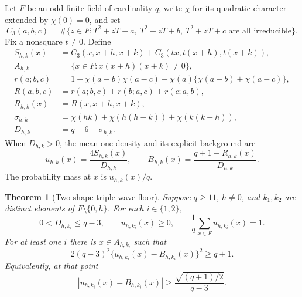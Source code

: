 \documentclass[11pt]{article}
\newtheorem{theorem}{Theorem}[section]
\begin{document}
Let \(F\) be an odd finite field of cardinality \(q\), write
\(\chi\) for its quadratic character extended by \(\chi(0)=0\), and set
\[
 C_3(a,b,c)=\#\{z\in F:T^2+zT+a,\ T^2+zT+b,\ T^2+zT+c
                       \text{ are all irreducible}\}.
\]
Fix a nonsquare \(t\ne0\). Define
\[
 \begin{split}
 S_{h,k}(x)&=C_3(x,x+h,x+k)
       +C_3(tx,t(x+h),t(x+k)),\\
 A_{h,k}&=\{x\in F:x(x+h)(x+k)\ne0\},\\
 r(a;b,c)&=1+\chi(a-b)\chi(a-c)
                    -\chi(a)\{\chi(a-b)+\chi(a-c)\},\\
 R(a,b,c)&=r(a;b,c)+r(b;a,c)+r(c;a,b),\\
 R_{h,k}(x)&=R(x,x+h,x+k),\\
 \sigma_{h,k}&=\chi(hk)+\chi(h(h-k))+\chi(k(k-h)),\\
 D_{h,k}&=q-6-\sigma_{h,k}.
 \end{split}
\]
When \(D_{h,k}>0\), the mean-one density and its explicit background are
\[
 u_{h,k}(x)=\frac{4S_{h,k}(x)}{D_{h,k}},\qquad
 B_{h,k}(x)=\frac{q+1-R_{h,k}(x)}{D_{h,k}}.
\]
The probability mass at \(x\) is \(u_{h,k}(x)/q\).

\begin{theorem}[Two-shape triple-wave floor]\label{thm:tripleWaveFloor}
Suppose \(q\ge11\), \(h\ne0\), and \(k_1,k_2\) are distinct elements
of \(F\setminus\{0,h\}\). For each \(i\in\{1,2\}\),
\[
 0<D_{h,k_i}\le q-3,\qquad
 u_{h,k_i}(x)\ge0,\qquad
 \frac1q\sum_{x\in F}u_{h,k_i}(x)=1.
\]
For at least one \(i\) there is \(x\in A_{h,k_i}\) such that
\[
 2(q-3)^2\{u_{h,k_i}(x)-B_{h,k_i}(x)\}^2\ge q+1.
 \tag{TW}
\]
Equivalently, at that point
\[
 |u_{h,k_i}(x)-B_{h,k_i}(x)|
       \ge\frac{\sqrt{(q+1)/2}}{q-3}.
\]
\end{theorem}
\end{document}
